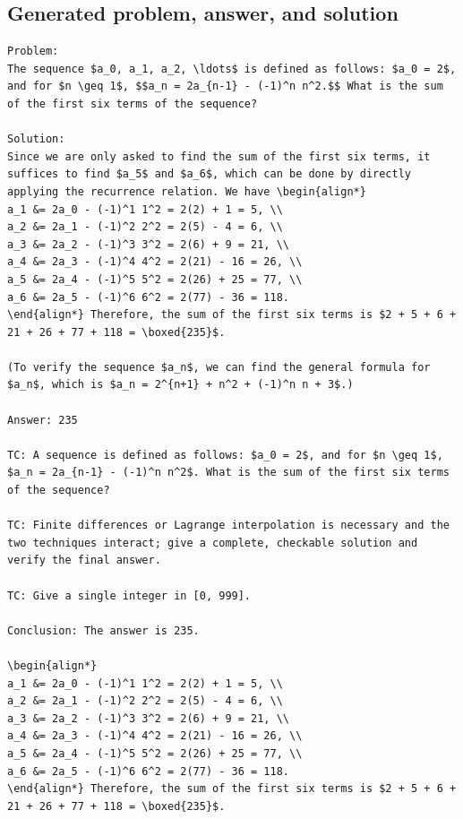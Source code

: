 \documentclass[11pt]{article}
\begin{document}
\subsection*{Generated problem, answer, and solution}
\begin{Verbatim}[breaklines=true,breakanywhere=true,fontsize=\small]
Problem:
The sequence $a_0, a_1, a_2, \ldots$ is defined as follows: $a_0 = 2$, and for $n \geq 1$, $$a_n = 2a_{n-1} - (-1)^n n^2.$$ What is the sum of the first six terms of the sequence?

Solution:
Since we are only asked to find the sum of the first six terms, it suffices to find $a_5$ and $a_6$, which can be done by directly applying the recurrence relation. We have \begin{align*}
a_1 &= 2a_0 - (-1)^1 1^2 = 2(2) + 1 = 5, \\
a_2 &= 2a_1 - (-1)^2 2^2 = 2(5) - 4 = 6, \\
a_3 &= 2a_2 - (-1)^3 3^2 = 2(6) + 9 = 21, \\
a_4 &= 2a_3 - (-1)^4 4^2 = 2(21) - 16 = 26, \\
a_5 &= 2a_4 - (-1)^5 5^2 = 2(26) + 25 = 77, \\
a_6 &= 2a_5 - (-1)^6 6^2 = 2(77) - 36 = 118.
\end{align*} Therefore, the sum of the first six terms is $2 + 5 + 6 + 21 + 26 + 77 + 118 = \boxed{235}$.

(To verify the sequence $a_n$, we can find the general formula for $a_n$, which is $a_n = 2^{n+1} + n^2 + (-1)^n n + 3$.)

Answer: 235

TC: A sequence is defined as follows: $a_0 = 2$, and for $n \geq 1$, $a_n = 2a_{n-1} - (-1)^n n^2$. What is the sum of the first six terms of the sequence?

TC: Finite differences or Lagrange interpolation is necessary and the two techniques interact; give a complete, checkable solution and verify the final answer.

TC: Give a single integer in [0, 999].

Conclusion: The answer is 235.

\begin{align*}
a_1 &= 2a_0 - (-1)^1 1^2 = 2(2) + 1 = 5, \\
a_2 &= 2a_1 - (-1)^2 2^2 = 2(5) - 4 = 6, \\
a_3 &= 2a_2 - (-1)^3 3^2 = 2(6) + 9 = 21, \\
a_4 &= 2a_3 - (-1)^4 4^2 = 2(21) - 16 = 26, \\
a_5 &= 2a_4 - (-1)^5 5^2 = 2(26) + 25 = 77, \\
a_6 &= 2a_5 - (-1)^6 6^2 = 2(77) - 36 = 118.
\end{align*} Therefore, the sum of the first six terms is $2 + 5 + 6 + 21 + 26 + 77 + 118 = \boxed{235}$.


\end{Verbatim}
\end{document}

